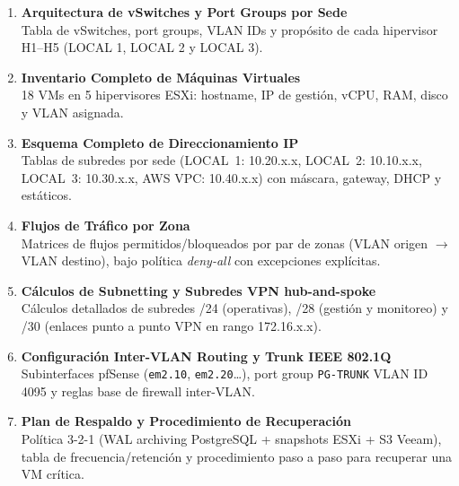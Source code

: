 \documentclass[11pt, a4paper, oneside]{report}
\begin{document}
\begin{enumerate}[label=\textbf{Anexo \Alph*.},leftmargin=4cm,labelsep=0.4cm,itemsep=14pt]

  \item {}\label{anex:vswitches}
  \textbf{Arquitectura de vSwitches y Port Groups por Sede}\\
  Tabla de vSwitches, port groups, VLAN IDs y propósito de cada hipervisor H1--H5
  (LOCAL 1, LOCAL 2 y LOCAL 3).

  \item {}\label{anex:vms}
  \textbf{Inventario Completo de Máquinas Virtuales}\\
  18 VMs en 5 hipervisores ESXi: hostname, IP de gestión, vCPU, RAM, disco y VLAN asignada.

  \item {}\label{anex:ip}
  \textbf{Esquema Completo de Direccionamiento IP}\\
  Tablas de subredes por sede (LOCAL~1: 10.20.x.x, LOCAL~2: 10.10.x.x,
  LOCAL~3: 10.30.x.x, AWS VPC: 10.40.x.x) con máscara, gateway, DHCP y estáticos.

  \item {}\label{anex:flujos}
  \textbf{Flujos de Tráfico por Zona}\\
  Matrices de flujos permitidos/bloqueados por par de zonas
  (VLAN origen $\to$ VLAN destino), bajo política \textit{deny-all} con excepciones explícitas.

  \item {}\label{anex:subnetting}
  \textbf{Cálculos de Subnetting y Subredes VPN hub-and-spoke}\\
  Cálculos detallados de subredes /24 (operativas), /28 (gestión y monitoreo)
  y /30 (enlaces punto a punto VPN en rango 172.16.x.x).

  \item {}\label{anex:routing}
  \textbf{Configuración Inter-VLAN Routing y Trunk IEEE 802.1Q}\\
  Subinterfaces pfSense (\texttt{em2.10}, \texttt{em2.20}\ldots),
  port group \texttt{PG-TRUNK} VLAN ID 4095 y reglas base de firewall inter-VLAN.

  \item {}\label{anex:respaldo}
  \textbf{Plan de Respaldo y Procedimiento de Recuperación}\\
  Política 3-2-1 (WAL archiving PostgreSQL + snapshots ESXi + S3 Veeam),
  tabla de frecuencia/retención y procedimiento paso a paso para recuperar una VM crítica.


\end{enumerate}
\end{document}
